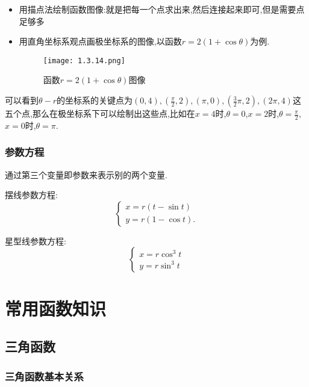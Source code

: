 \documentclass[8pt a4paper, oneside, UTF8]{ctexbook}  %
\begin{document}
\begin{sloppypar}
    \begin{itemize}
        \item 用描点法绘制函数图像:就是把每一个点求出来,然后连接起来即可,但是需要点足够多
        \item 用直角坐标系观点画极坐标系的图像,以函数$r=2(1+\cos \theta )$为例.
              \begin{figure}[H]
                  \centering \texttt{[image: 1.3.14.png]} \caption{函数$r=2(1+\cos \theta)$图像}
              \end{figure}
    \end{itemize}
    可以看到$\theta - r $的坐标系的关键点为$(0,4),(\frac{\pi}{2},2),(\pi,0),(\frac{3}{2}\pi,2),(2\pi,4)$这五个点,那么在极坐标系下可以绘制出这些点,比如在$x=4$时,$\theta = 0$,$x=2$时,$\theta = \frac{\pi}{2}$,$x=0$时,$\theta = \pi$.
    \subsubsection{参数方程}
    通过第三个变量即参数来表示别的两个变量.

    摆线参数方程:
    $$
        \left\{
        \begin{array}{l}
            x=r\left(t-\sin t\right) \\
            y=r\left(1-\cos t\right).
        \end{array}
        \right.
    $$

    星型线参数方程:
    $$
        \left\{
        \begin{array}{l}
            x=r \cos^3 t \\
            y=r \sin^3 t
        \end{array}
        \right.
    $$
    \section{常用函数知识}
    \subsection{三角函数}
    \subsubsection{三角函数基本关系}
    \begin{center}
    \end{center}

\end{sloppypar}
\end{document}
